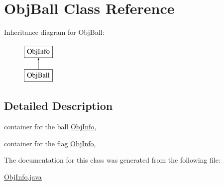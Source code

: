 \hypertarget{classObjBall}{
\section{ObjBall Class Reference}
\label{classObjBall}
}
Inheritance diagram for ObjBall:\begin{figure}[H]
\begin{center}
\leavevmode
\includegraphics[height=2.000000cm]{classObjBall}
\end{center}
\end{figure}


\subsection{Detailed Description}
container for the ball \hyperlink{classObjInfo}{ObjInfo},

container for the flag \hyperlink{classObjInfo}{ObjInfo}, 

The documentation for this class was generated from the following file:\begin{DoxyCompactItemize}
\item 
\hyperlink{ObjInfo_8java}{ObjInfo.java}\end{DoxyCompactItemize}
